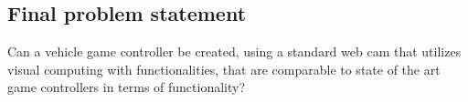 \subsection{Final problem statement} \label{sec:fps}
Can a vehicle game controller be created, using a standard web cam that utilizes visual computing with functionalities, that are comparable to state of the art game controllers in terms of functionality?
